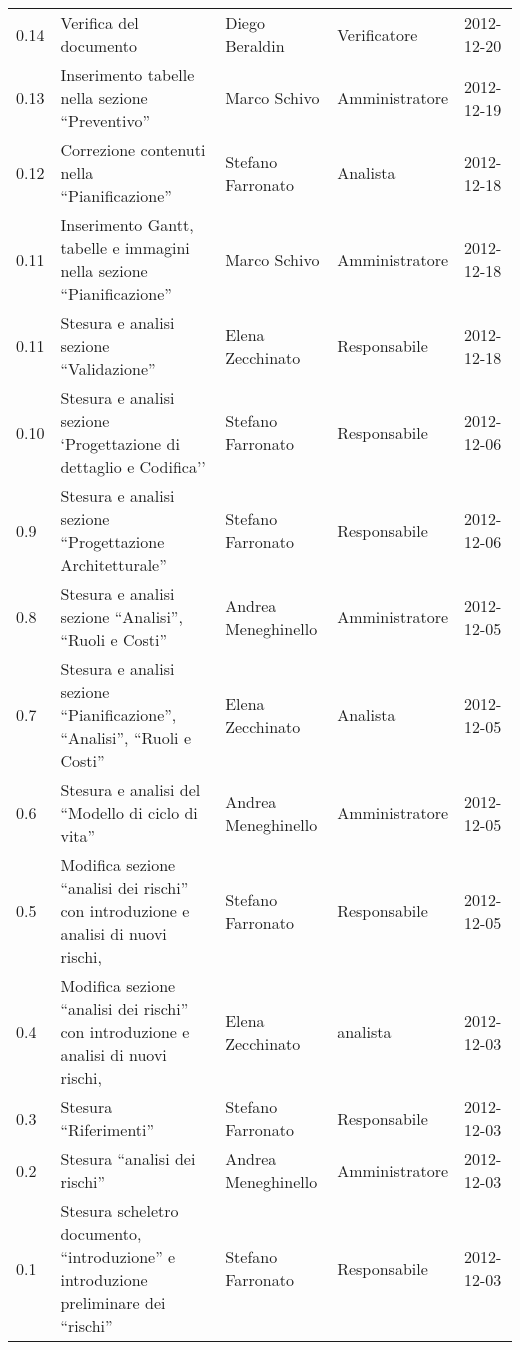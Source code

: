 \begin{longtable}{lp{}lll}
0.14 &Verifica del documento & Diego Beraldin & Verificatore & 2012-12-20\\
0.13 &Inserimento tabelle nella sezione ``Preventivo'' & Marco Schivo & Amministratore & 2012-12-19\\
0.12 &Correzione contenuti nella ``Pianificazione'' & Stefano Farronato & Analista & 2012-12-18\\
0.11 &Inserimento Gantt, tabelle e immagini nella sezione ``Pianificazione'' & Marco Schivo & Amministratore & 2012-12-18\\
0.11 &Stesura e analisi sezione ``Validazione'' & Elena Zecchinato & Responsabile & 2012-12-18\\
0.10 &Stesura e analisi sezione `Progettazione di dettaglio e Codifica'' & Stefano Farronato & Responsabile & 2012-12-06\\
0.9 &Stesura e analisi sezione ``Progettazione Architetturale'' & Stefano Farronato & Responsabile & 2012-12-06\\
0.8 &Stesura e analisi sezione ``Analisi'', ``Ruoli e Costi'' & Andrea Meneghinello & Amministratore & 2012-12-05\\
0.7 &Stesura e analisi sezione ``Pianificazione'', ``Analisi'', ``Ruoli e Costi'' & Elena Zecchinato & Analista & 2012-12-05\\
0.6 &Stesura e analisi del ``Modello di ciclo di vita'' & Andrea Meneghinello & Amministratore & 2012-12-05\\
0.5 &Modifica sezione ``analisi dei rischi'' con introduzione e analisi di nuovi rischi, & Stefano Farronato & Responsabile & 2012-12-05\\
0.4 & Modifica sezione ``analisi dei rischi'' con introduzione e analisi di nuovi rischi, & Elena Zecchinato & analista & 2012-12-03\\
0.3 & Stesura ``Riferimenti'' & Stefano Farronato & Responsabile & 2012-12-03\\
0.2 & Stesura ``analisi dei rischi'' & Andrea Meneghinello & Amministratore & 2012-12-03\\
0.1 & Stesura scheletro documento, ``introduzione'' e introduzione preliminare dei ``rischi'' & Stefano Farronato & Responsabile & 2012-12-03\\
\bottomrule
\end{longtable}
\newpage



\setcounter{page}{1}
\pagestyle{normal}

